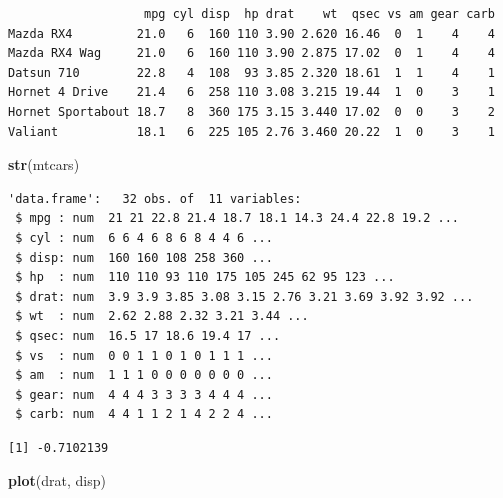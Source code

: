 \documentclass[]{article}
\newenvironment{Shaded}{\begin{snugshade}}{\end{snugshade}}
\newcommand{\KeywordTok}[1]{\textcolor[rgb]{0.13,0.29,0.53}{\textbf{#1}}}
\newcommand{\StringTok}[1]{\textcolor[rgb]{0.31,0.60,0.02}{#1}}
\newcommand{\OperatorTok}[1]{\textcolor[rgb]{0.81,0.36,0.00}{\textbf{#1}}}
\newcommand{\NormalTok}[1]{#1}
\begin{document}
\begin{verbatim}
                   mpg cyl disp  hp drat    wt  qsec vs am gear carb
Mazda RX4         21.0   6  160 110 3.90 2.620 16.46  0  1    4    4
Mazda RX4 Wag     21.0   6  160 110 3.90 2.875 17.02  0  1    4    4
Datsun 710        22.8   4  108  93 3.85 2.320 18.61  1  1    4    1
Hornet 4 Drive    21.4   6  258 110 3.08 3.215 19.44  1  0    3    1
Hornet Sportabout 18.7   8  360 175 3.15 3.440 17.02  0  0    3    2
Valiant           18.1   6  225 105 2.76 3.460 20.22  1  0    3    1
\end{verbatim}

\begin{Shaded}
\begin{Highlighting}[]
\KeywordTok{str}\NormalTok{(mtcars)}
\end{Highlighting}
\end{Shaded}

\begin{verbatim}
'data.frame':   32 obs. of  11 variables:
 $ mpg : num  21 21 22.8 21.4 18.7 18.1 14.3 24.4 22.8 19.2 ...
 $ cyl : num  6 6 4 6 8 6 8 4 4 6 ...
 $ disp: num  160 160 108 258 360 ...
 $ hp  : num  110 110 93 110 175 105 245 62 95 123 ...
 $ drat: num  3.9 3.9 3.85 3.08 3.15 2.76 3.21 3.69 3.92 3.92 ...
 $ wt  : num  2.62 2.88 2.32 3.21 3.44 ...
 $ qsec: num  16.5 17 18.6 19.4 17 ...
 $ vs  : num  0 0 1 1 0 1 0 1 1 1 ...
 $ am  : num  1 1 1 0 0 0 0 0 0 0 ...
 $ gear: num  4 4 4 3 3 3 3 4 4 4 ...
 $ carb: num  4 4 1 1 2 1 4 2 2 4 ...
\end{verbatim}

\begin{Shaded}
\end{Shaded}

\begin{verbatim}
[1] -0.7102139
\end{verbatim}

\begin{Shaded}
\begin{Highlighting}[]
\KeywordTok{plot}\NormalTok{(drat, disp)}
\end{Highlighting}
\end{Shaded}
\end{document}
